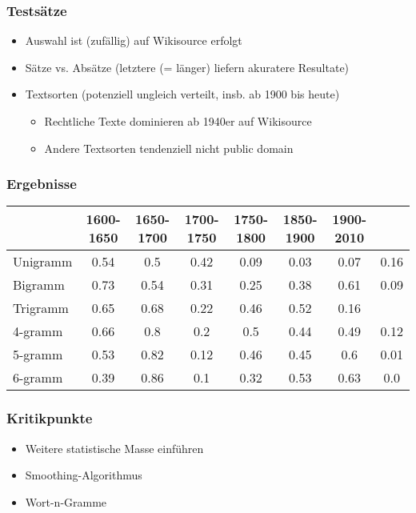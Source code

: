 \documentclass[t]{beamer} %
\begin{document}
\begin{frame}
  \frametitle{Testsätze}
  \begin{itemize}
  \item Auswahl ist (zufällig) auf Wikisource erfolgt\pause
  \vspace*{1ex}
  \item Sätze vs. Absätze (letztere (= länger) liefern akuratere Resultate)\pause
  \item Textsorten (potenziell ungleich verteilt, insb. ab 1900 bis heute)\pause
  \begin{itemize}
   \item Rechtliche Texte dominieren ab 1940er auf Wikisource
   \item Andere Textsorten tendenziell nicht public domain
  \end{itemize}
  \end{itemize}  
\end{frame}

\begin{frame}
  \frametitle{Ergebnisse}
  \begin{tabular}{l|ccccccc}
    & 1600-1650 & 1650-1700 & 1700-1750 & 1750-1800 & 1850-1900 &
    1900-2010 \\
    \hline
    Unigramm & 0.54 & 0.5 & 0.42 & 0.09 & 0.03 & 0.07 & 0.16 \\
    Bigramm & 0.73 & 0.54 & 0.31 & 0.25 & 0.38 & 0.61 & 0.09 \\
    Trigramm & 0.65 & 0.68 & 0.22 & 0.46 & 0.52 & 0.16 \\
    4-gramm & 0.66 & 0.8 & 0.2 & 0.5 & 0.44 & 0.49 & 0.12 \\
    5-gramm & 0.53 & 0.82 & 0.12 & 0.46 & 0.45 & 0.6 & 0.01 \\
    6-gramm & 0.39 & 0.86 & 0.1 & 0.32 & 0.53 & 0.63 & 0.0 \\
  \end{tabular}
\end{frame}

\begin{frame}
  \frametitle{Kritikpunkte}
  \begin{itemize}
  \item Weitere statistische Masse einführen\pause
  \item Smoothing-Algorithmus\pause
  \item Wort-n-Gramme
  \end{itemize}  
\end{frame}
\end{document}

